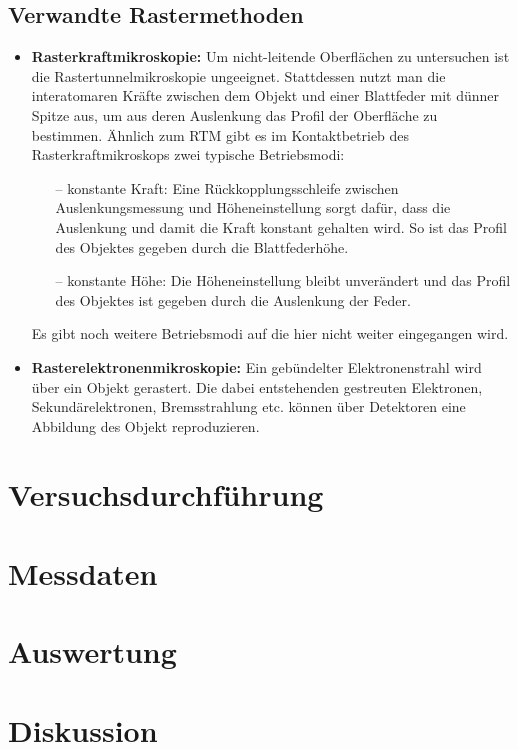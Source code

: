 \documentclass[10pt, a4paper]{article}
\begin{document}
\subsection{Verwandte Rastermethoden}
\begin{itemize}
  \item \textbf{Rasterkraftmikroskopie:} Um nicht-leitende Oberflächen zu untersuchen ist die Rastertunnelmikroskopie ungeeignet.
  Stattdessen nutzt man die interatomaren Kräfte zwischen dem Objekt und einer Blattfeder mit dünner Spitze aus, um aus deren Auslenkung das Profil der Oberfläche zu bestimmen.
  Ähnlich zum RTM gibt es im Kontaktbetrieb des Rasterkraftmikroskops zwei typische Betriebsmodi:
  \begin{itemize}
  \item[--] konstante Kraft: Eine Rückkopplungsschleife zwischen Auslenkungsmessung und Höheneinstellung sorgt dafür, dass die Auslenkung und damit die Kraft konstant gehalten wird.
  So ist das Profil des Objektes gegeben durch die Blattfederhöhe.
  \item[--] konstante Höhe: Die Höheneinstellung bleibt unverändert und das Profil des Objektes ist gegeben durch die Auslenkung der Feder.
  \end{itemize}
  Es gibt noch weitere Betriebsmodi auf die hier nicht weiter eingegangen wird.
  \item \textbf{Rasterelektronenmikroskopie:} Ein gebündelter Elektronenstrahl wird über ein Objekt gerastert.
  Die dabei entstehenden gestreuten Elektronen, Sekundärelektronen, Bremsstrahlung etc. können über Detektoren eine Abbildung des Objekt reproduzieren.
\end{itemize}

\section{Versuchsdurchführung}

\section{Messdaten}

\section{Auswertung}

\section{Diskussion}
\end{document}

